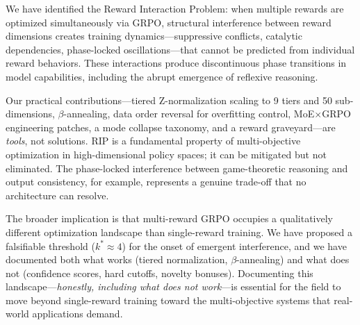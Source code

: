 \documentclass[sigconf]{acmart}
\begin{document}
We have identified the Reward Interaction Problem: when multiple rewards are optimized simultaneously via GRPO, structural interference between reward dimensions creates training dynamics---suppressive conflicts, catalytic dependencies, phase-locked oscillations---that cannot be predicted from individual reward behaviors. These interactions produce discontinuous phase transitions in model capabilities, including the abrupt emergence of reflexive reasoning.

Our practical contributions---tiered Z-normalization scaling to 9 tiers and 50 sub-dimensions, $\beta$-annealing, data order reversal for overfitting control, MoE$\times$GRPO engineering patches, a mode collapse taxonomy, and a reward graveyard---are \textit{tools}, not solutions. RIP is a fundamental property of multi-objective optimization in high-dimensional policy spaces; it can be mitigated but not eliminated. The phase-locked interference between game-theoretic reasoning and output consistency, for example, represents a genuine trade-off that no architecture can resolve.

The broader implication is that multi-reward GRPO occupies a qualitatively different optimization landscape than single-reward training. We have proposed a falsifiable threshold ($k^* \approx 4$) for the onset of emergent interference, and we have documented both what works (tiered normalization, $\beta$-annealing) and what does not (confidence scores, hard cutoffs, novelty bonuses). Documenting this landscape---\textit{honestly, including what does not work}---is essential for the field to move beyond single-reward training toward the multi-objective systems that real-world applications demand.



\end{document}
